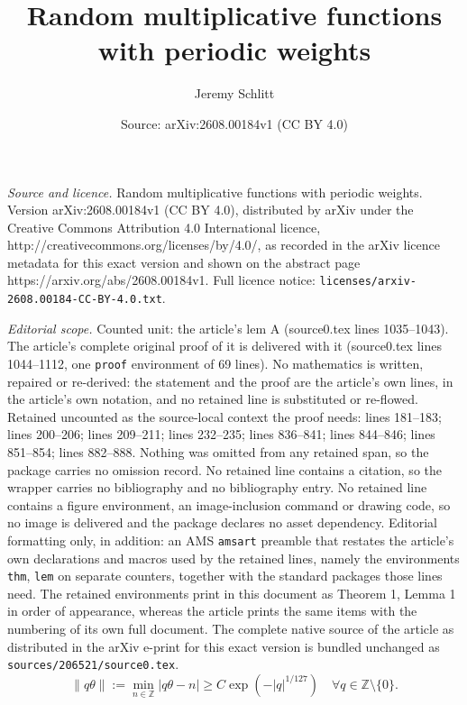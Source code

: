 \documentclass[10pt,a4paper]{amsart}
\title{Random multiplicative functions with periodic weights}
\author{Jeremy Schlitt}
\date{Source: arXiv:2608.00184v1 (CC BY 4.0)}
\newcommand{\Z}{\mathbb{Z}}
\renewcommand{\geq}{\geqslant}
\begin{document}
\maketitle

\noindent\emph{Source and licence.} Random multiplicative functions with periodic weights. Version arXiv:2608.00184v1 (CC BY 4.0), distributed by arXiv under the Creative Commons Attribution 4.0 International licence, http://creativecommons.org/licenses/by/4.0/, as recorded in the arXiv licence metadata for this exact version and shown on the abstract page https://arxiv.org/abs/2608.00184v1. Full licence notice: \texttt{licenses/arxiv-2608.00184-CC-BY-4.0.txt}.\par\smallskip

\noindent\textit{Editorial scope.} Counted unit: the article's lem A (source0.tex lines 1035--1043). The article's complete original proof of it is delivered with it (source0.tex lines 1044--1112, one \texttt{proof} environment of 69 lines). No mathematics is written, repaired or re-derived: the statement and the proof are the article's own lines, in the article's own notation, and no retained line is substituted or re-flowed.  Retained uncounted as the source-local context the proof needs: lines 181--183; lines 200--206; lines 209--211; lines 232--235; lines 836--841; lines 844--846; lines 851--854; lines 882--888.  Nothing was omitted from any retained span, so the package carries no omission record.  No retained line contains a citation, so the wrapper carries no bibliography and no bibliography entry.  No retained line contains a figure environment, an image-inclusion command or drawing code, so no image is delivered and the package declares no asset dependency.  Editorial formatting only, in addition: an AMS \texttt{amsart} preamble that restates the article's own declarations and macros used by the retained lines, namely the environments \texttt{thm}, \texttt{lem} on separate counters, together with the standard packages those lines need.  The retained environments print in this document as Theorem 1, Lemma 1 in order of appearance, whereas the article prints the same items with the numbering of its own full document.  The complete native source of the article as distributed in the arXiv e-print for this exact version is bundled unchanged as \texttt{sources/206521/source0.tex}.
	\begin{equation}\label{eq:sound-xu badness approx}
		\|q\theta\|:= \min_{n \in \Z}|q \theta -n |\geq C\exp(-|q|^{1/127}) \quad \forall q \in \Z \setminus \{0\}.
	\end{equation}
\end{document}
